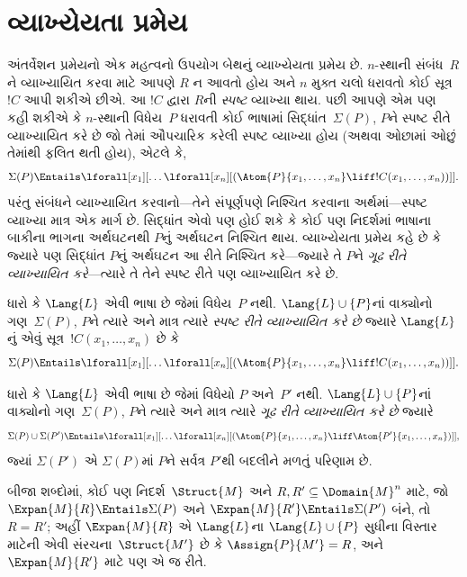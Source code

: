 \begingroup
\makeatletter{}\makeatother


\section{વ્યાખ્યેયતા પ્રમેય}
\label{guunit:OLP-0202}


અંતર્વેશન પ્રમેયનો એક મહત્વનો ઉપયોગ બેથનું વ્યાખ્યેયતા પ્રમેય છે.
$n$-સ્થાની સંબંધ~$R$ને વ્યાખ્યાયિત કરવા માટે આપણે $R$ ન આવતો હોય
અને $n$ મુક્ત ચલો ધરાવતો કોઈ સૂત્ર~$!C$ આપી શકીએ
છીએ. આ $!C$ દ્વારા $R$ની \emph{સ્પષ્ટ} વ્યાખ્યા થાય. પછી આપણે એમ
પણ કહી શકીએ કે $n$-સ્થાની વિધેય~$P$ ધરાવતી કોઈ ભાષામાં
સિદ્ધાંત~$\Sigma(P)$, $P$ને સ્પષ્ટ રીતે વ્યાખ્યાયિત કરે છે જો તેમાં
ઔપચારિક કરેલી સ્પષ્ટ વ્યાખ્યા હોય (અથવા ઓછામાં ઓછું તેમાંથી ફલિત થતી
હોય), એટલે કે,
\[
\Sigma(P) \Entails \lforall[x_1][\dots
  \lforall[x_n][(\Atom{P}{x_1,\dots, x_n} \liff !C(x_1, \dots,
    x_n))]].
\]
પરંતુ સંબંધને વ્યાખ્યાયિત કરવાનો---તેને સંપૂર્ણપણે નિશ્ચિત કરવાના
અર્થમાં---સ્પષ્ટ વ્યાખ્યા માત્ર એક માર્ગ છે. સિદ્ધાંત એવો પણ હોઈ શકે
કે કોઈ પણ નિદર્શમાં ભાષાના બાકીના ભાગના અર્થઘટનથી $P$નું
અર્થઘટન નિશ્ચિત થાય. વ્યાખ્યેયતા પ્રમેય કહે છે કે જ્યારે પણ સિદ્ધાંત
$P$નું અર્થઘટન આ રીતે નિશ્ચિત કરે---જ્યારે તે $P$ને \emph{ગૂઢ રીતે
વ્યાખ્યાયિત કરે}---ત્યારે તે તેને સ્પષ્ટ રીતે પણ વ્યાખ્યાયિત કરે છે.

\begin{defn}
ધારો કે $\Lang{L}$ એવી ભાષા છે જેમાં વિધેય~$P$ નથી.
$\Lang{L}\cup\{P\}$નાં વાક્યોનો ગણ~$\Sigma(P)$, $P$ને ત્યારે
અને માત્ર ત્યારે \emph{સ્પષ્ટ રીતે વ્યાખ્યાયિત કરે છે} જ્યારે
$\Lang{L}$નું એવું સૂત્ર~$!C(x_1,\dots,x_n)$ છે કે
\[
\Sigma(P) \Entails \lforall[x_1][\dots
  \lforall[x_n][(\Atom{P}{x_1,\dots, x_n} \liff !C(x_1, \dots,
    x_n))]].
\]
\end{defn}

\begin{defn}
ધારો કે $\Lang{L}$ એવી ભાષા છે જેમાં વિધેયો $P$
અને~$P'$ નથી. $\Lang{L}\cup\{P\}$નાં વાક્યોનો ગણ~$\Sigma(P)$,
$P$ને ત્યારે અને માત્ર ત્યારે \emph{ગૂઢ રીતે વ્યાખ્યાયિત કરે છે}
જ્યારે
\[
\Sigma(P) \cup \Sigma(P') \Entails \lforall[x_1][\dots
  \lforall[x_n][(\Atom{P}{x_1,\dots, x_n} \liff \Atom{P'}{x_1,\dots,
      x_n})]],
\]
જ્યાં $\Sigma(P')$ એ $\Sigma(P)$માં $P$ને સર્વત્ર $P'$થી બદલીને
મળતું પરિણામ છે.
\end{defn}

બીજા શબ્દોમાં, કોઈ પણ નિદર્શ~$\Struct{M}$ અને $R,R'\subseteq
\Domain{M}^n$ માટે, જો $\Expan{M}{R}\Entails\Sigma(P)$ અને
$\Expan{M}{R'}\Entails\Sigma(P')$ બંને, તો $R=R'$; અહીં
$\Expan{M}{R}$ એ $\Lang{L}$ના $\Lang{L}\cup\{P\}$ સુધીના વિસ્તાર
માટેની એવી સંરચના~$\Struct{M'}$ છે કે $\Assign{P}{M'}=R$, અને
$\Expan{M}{R'}$ માટે પણ એ જ રીતે.

